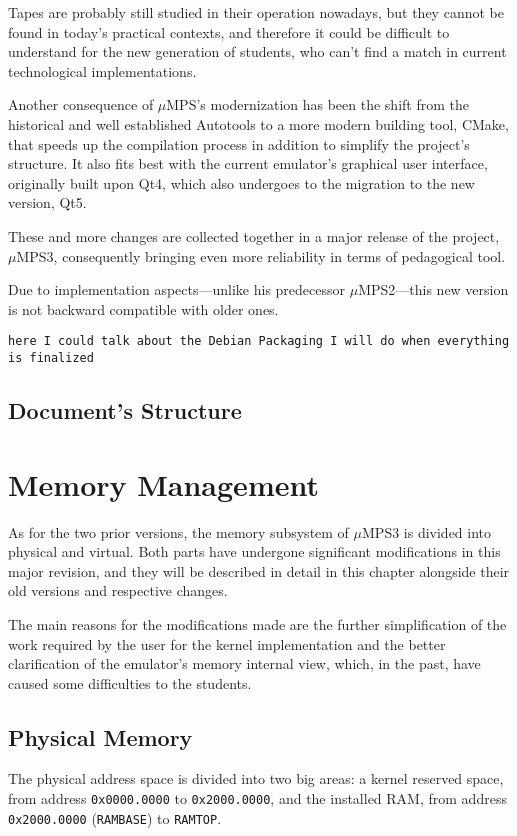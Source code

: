\documentclass[12pt,a4paper,openright,twoside]{report}
\begin{document}
	Tapes are probably still studied in their operation nowadays, but they cannot be found in today's practical contexts, and therefore it could be difficult to understand for the new generation of students, who can't find a match in current technological implementations.
	
	Another consequence of $\mu$MPS's modernization has been the shift from the historical and well established Autotools to a more modern building tool, CMake, that speeds up the compilation process in addition to simplify the project's structure.
	It also fits best with the current emulator's graphical user interface, originally built upon Qt4, which also undergoes to the migration to the new version, Qt5.
	
	These and more changes are collected together in a major release of the project, $\mu$MPS3, consequently bringing even more reliability in terms of pedagogical tool.
	
	Due to implementation aspects---unlike his predecessor $\mu$MPS2---this new version is not backward compatible with older ones.

	\texttt{here I could talk about the Debian Packaging I will do when everything is finalized}
\section{Document's Structure}
\chapter{Memory Management}
\lhead[\fancyplain{}{\bfseries\thepage}]{\fancyplain{}{\bfseries\rightmark}}
	As for the two prior versions, the memory subsystem of $\mu$MPS3 is divided into physical and virtual.
	Both parts have undergone significant modifications in this major revision, and they will be described in detail in this chapter alongside their old versions and respective changes.
	
	The main reasons for the modifications made are the further simplification of the work required by the user for the kernel implementation and the better clarification of the emulator's memory internal view, which, in the past, have caused some difficulties to the students.

\section{Physical Memory}
	The physical address space is divided into two big areas: a kernel reserved space, from address \texttt{0x0000.0000} to \texttt{0x2000.0000}, and the installed RAM, from address \texttt{0x2000.0000} (\texttt{RAMBASE}) to \texttt{RAMTOP}. 
	
\end{document}

